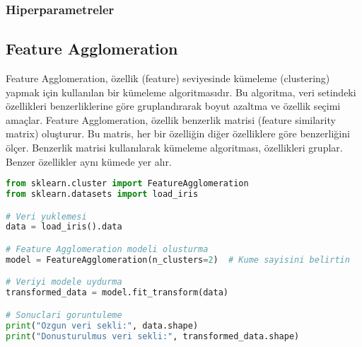 \subsubsection{Hiperparametreler}
\begin{table}[h]
\centering
{\scriptsize\renewcommand{\arraystretch}{0.4}
{}}
\end{table}

\subsection{Feature Agglomeration}
Feature Agglomeration, özellik (feature) seviyesinde kümeleme (clustering) yapmak için kullanılan bir kümeleme algoritmasıdır. Bu algoritma, veri setindeki özellikleri benzerliklerine göre gruplandırarak boyut azaltma ve özellik seçimi amaçlar. Feature Agglomeration, özellik benzerlik matrisi (feature similarity matrix) oluşturur. Bu matris, her bir özelliğin diğer özelliklere göre benzerliğini ölçer. Benzerlik matrisi kullanılarak kümeleme algoritması, özellikleri gruplar. Benzer özellikler aynı kümede yer alır.

\begin{lstlisting}[language=Python, caption=Scikit-learn'de FeatureAgglomeration örneği.]
from sklearn.cluster import FeatureAgglomeration
from sklearn.datasets import load_iris

# Veri yuklemesi
data = load_iris().data

# Feature Agglomeration modeli olusturma
model = FeatureAgglomeration(n_clusters=2)  # Kume sayisini belirtin

# Veriyi modele uydurma
transformed_data = model.fit_transform(data)

# Sonuclari goruntuleme
print("Ozgun veri sekli:", data.shape)
print("Donusturulmus veri sekli:", transformed_data.shape)
\end{lstlisting}

